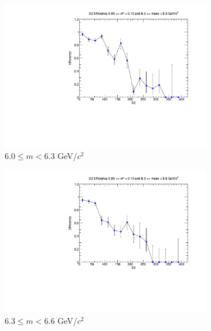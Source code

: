 \begin{figure}[p]
\begin{subfigure}[b]{0.32\textwidth}
        \includegraphics[width=\textwidth]{./kTrackerEfficiencyPlots/D2_Efficiency_xF1_mass6.pdf}
        \caption{$6.0 \leq m < 6.3$ GeV/$c^2$}
        \label{fig:xF1_mass6}
    \end{subfigure}
    \hfill
    \begin{subfigure}[b]{0.32\textwidth}
        \centering
        \includegraphics[width=\textwidth]{./kTrackerEfficiencyPlots/D2_Efficiency_xF1_mass7.pdf}
        \caption{$6.3 \leq m < 6.6$ GeV/$c^2$}
        \label{fig:xF1_mass7}
    \end{subfigure}
    \hfill
    \begin{subfigure}[b]{0.32\textwidth}
        \centering

\end{subfigure}
\end{figure}
